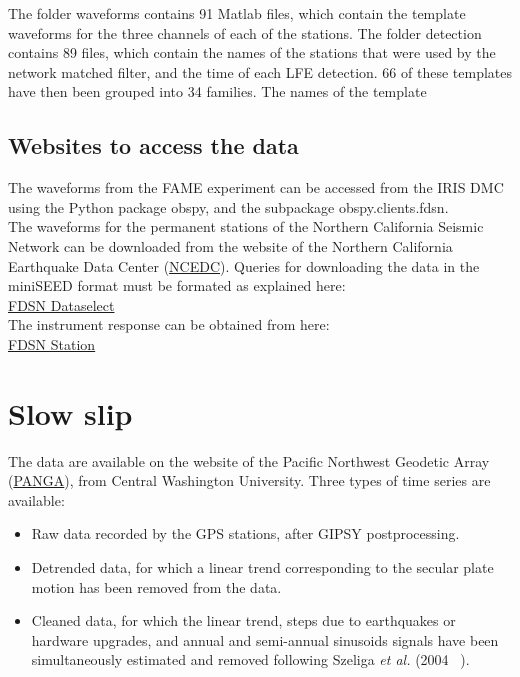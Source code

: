 \documentclass[main.tex]{subfiles}
\begin{document}
The folder waveforms contains 91 Matlab files, which contain the template waveforms for the three channels of each of the stations. The folder detection contains 89 files, which contain the names of the stations that were used by the network matched filter, and the time of each LFE detection. 66 of these templates have then been grouped into 34 families. The names of the template

\section{Websites to access the data}

The waveforms from the FAME experiment can be accessed from the IRIS DMC using the Python package obspy, and the subpackage obspy.clients.fdsn. \\

The waveforms for the permanent stations of the Northern California Seismic Network can be downloaded from the website of the Northern California Earthquake Data Center (\href{http://ncedc.org/}{NCEDC}). Queries for downloading the data in the miniSEED format must be formated as explained here: \\

\href{http://service.ncedc.org/fdsnws/dataselect/1/#description-box}{FDSN Dataselect} \\

The instrument response can be obtained from here: \\

\href{http://service.ncedc.org/fdsnws/station/1/#description-box}{FDSN Station}

\chapter{Slow slip}

The data are available on the website of the Pacific Northwest Geodetic Array (\href{http://www.geodesy.cwu.edu/}{PANGA}), from Central Washington University. Three types of time series are available:

\begin{itemize}
\item Raw data recorded by the GPS stations, after GIPSY postprocessing.
\item Detrended data, for which a linear trend corresponding to the secular plate motion has been removed from the data.
\item Cleaned data, for which the linear trend, steps due to earthquakes or hardware upgrades, and annual and semi-annual sinusoids signals have been simultaneously estimated and removed following Szeliga \textit{et al.} (2004 ~\cite{SZE_2004}).
\end{itemize}
\end{document}
